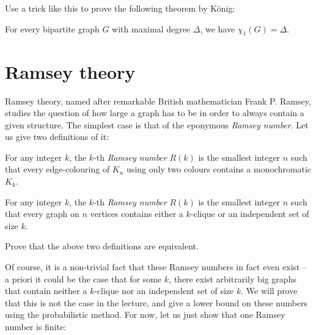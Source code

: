 \documentclass[nobib]{tufte-handout}
\begin{document}
\begin{xca}
    Use a trick like this to prove the following theorem by König:

    \begin{theorem}[König, 1916]
        For every bipartite graph $G$ with maximal degree $\Delta$, we have $\chi_1(G) = \Delta$.
    \end{theorem}
\end{xca}

\section{Ramsey theory}

Ramsey theory, named after remarkable British mathematician Frank P. Ramsey, studies the question of how large a graph has to be in order to always contain a given structure. The simplest case is that of the eponymous \emph{Ramsey number}. Let us give two definitions of it:

\begin{definition}
    For any integer $k$, the $k$-th \emph{Ramsey number} $R(k)$ is the smallest integer $n$ such that every edge-colouring of $K_n$ using only two colours contains a monochromatic $K_k$.
\end{definition}

\begin{definition}
    For any integer $k$, the $k$-th \emph{Ramsey number} $R(k)$ is the smallest integer $n$ such that every graph on $n$ vertices contains either a $k$-clique or an independent set of size $k$.
\end{definition}

\begin{xca}
    Prove that the above two definitions are equivalent.
\end{xca}

Of course, it is a non-trivial fact that these Ramsey numbers in fact even exist -- a priori it could be the case that for some $k$, there exist arbitrarily big graphs that contain neither a $k$-clique nor an independent set of size $k$. We will prove that this is not the case in the lecture, and give a lower bound on these numbers using the probabilistic method. For now, let us just show that one Ramsey number is finite:
\end{document}
